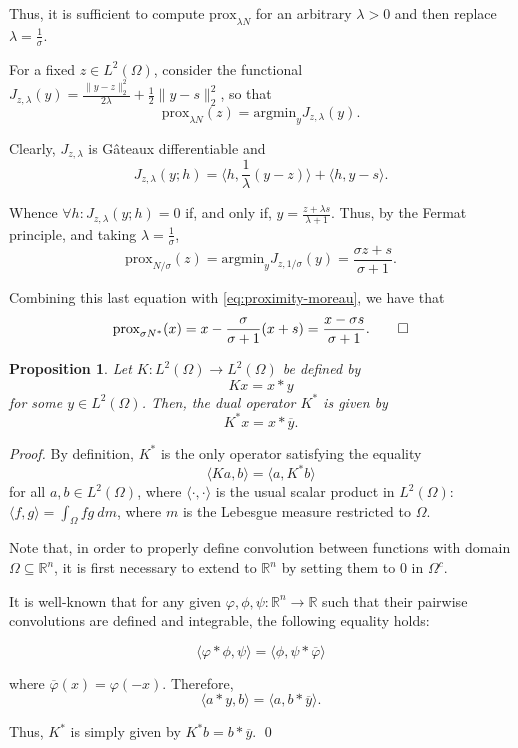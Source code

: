 \documentclass[twocolumn,twoside,a4paper,10pt]{IEEEtran}
\newtheorem{proposition}{Proposition}
\begin{document}
Thus, it is sufficient to compute \(\text{prox}_{\lambda N}\) for an arbitrary \(\lambda > 0\) and then replace \(\lambda = \frac 1\sigma\).

For a fixed \(z\in L^2(\Omega)\), consider the functional \(J_{z, \lambda}(y) = \frac{\|y - z\|_{2}^2}{2\lambda} + \frac12 \|y - s\|_{2}^2\), so that
\[
  \text{prox}_{\lambda N}(z) = \text{argmin}_{y}J_{z, \lambda}(y)
.\]

Clearly, \(J_{z, \lambda}\) is Gâteaux differentiable and
\[
  J_{z, \lambda}(y; h) = \langle h, \frac 1\lambda(y-z)\rangle + \langle h, y-s\rangle
.\]

Whence \(\forall h\colon J_{z, \lambda}(y; h) = 0\) if, and only if, \(y=\frac{z + \lambda s}{\lambda + 1}\). Thus, by the Fermat principle, and taking \(\lambda = \frac 1\sigma\),
\[
  \text{prox}_{N / \sigma}(z) = \text{argmin}_{y}J_{z, 1/\sigma}(y) = \frac{\sigma z+ s}{\sigma + 1}
.\]

Combining this last equation with \cref{eq:proximity-moreau}, we have that
\[
  \text{prox}_{\sigma N^*}(x) = x -\frac{\sigma}{\sigma + 1}(x+s) = \frac{x - \sigma s}{\sigma + 1}
.\qed\]

\begin{proposition}\label{prop:proximity-convolution}
  Let \(K\colon L^2(\Omega)\to L^2(\Omega)\) be defined by
  \[
    Kx = x\ast y
  \]
  for some \(y\in L^2(\Omega)\). Then, the dual operator \(K^*\) is given by \[K^*x=x\ast\overline{y}.\]
\end{proposition}
\textit{Proof. } By definition, \(K^*\) is the only operator satisfying the equality
\[
  \langle Ka, b \rangle = \langle a, K^* b\rangle
\]
for all \(a, b\in L^2(\Omega)\), where \(\langle\cdot,\cdot\rangle\) is the usual scalar product in \(L^2(\Omega)\): \(\langle f, g\rangle = \int_{\Omega}fg~dm\), where \(m\) is the Lebesgue measure restricted to \(\Omega\).

Note that, in order to properly define convolution between functions with domain \(\Omega\subseteq\mathbb{R}^n\), it is first necessary to extend to \(\mathbb{R}^n\) by setting them to \(0\) in \(\Omega^c\).

It is well-known that for any given \(\varphi, \phi, \psi\colon\mathbb{R}^n\to\mathbb{R}\) such that their pairwise convolutions are defined and integrable, the following equality holds:

\begin{equation}\label{eq:convolution/inversion}
  \langle\varphi\ast\phi, \psi\rangle = \langle\phi, \psi\ast\overline{\varphi}\rangle
\end{equation}

where \(\overline{\varphi}(x) = \varphi(-x)\). Therefore,
\[
  \langle a\ast y, b\rangle = \langle a, b\ast\overline{y} \rangle
.\]

Thus, \(K^*\) is simply given by \(K^*b = b\ast \overline{y}\). \qed



\end{document}
